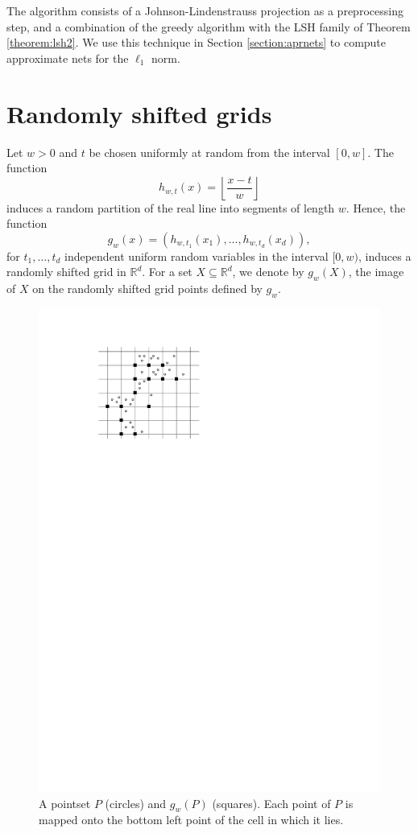 \documentclass[10pt,a4paper,twoside]{book}
\newcommand{\rd}{\mathbb{R}^{d}}
\theoremstyle{definition}
\theoremstyle{remark}
\begin{document}
The algorithm consists of a Johnson-Lindenstrauss projection as a preprocessing step, and a combination of the greedy algorithm with the LSH family of Theorem \ref{theorem:lsh2}. We use this technique in Section \ref{section:aprnets} to compute approximate nets for the $\ell_1$ norm.

\section{Randomly shifted grids} \label{grids}

Let $w >0$ and $t$ be chosen uniformly at random from the interval $[0,w]$. The function 
\[h_{w, t}(x)=\left\lfloor \frac{x-t}{w} \right\rfloor\]
induces a random partition of the real line into segments of length $w$. Hence, the function 
\[g_{w}(x)=(h_{w,t_1}(x_1),...,h_{w,t_d}(x_d)),\]
for $t_1,\ldots,t_d$ independent uniform random variables in the interval $[0,w)$, 
induces a randomly shifted grid in $\rd$. For a set $X \subseteq \rd$, we denote by $g_{w}(X)$, the image of $X$ on the randomly shifted grid points defined by $g_{w}$. 

\begin{figure}[ht]
    \centering
    \includegraphics[scale=0.7]{figures/grid2.pdf}
    \caption{A pointset $P$ (circles) and $g_w(P)$ (squares). Each point of $P$ is mapped onto the bottom left point of the cell in which it lies.}
    \label{fig:grid78}
\end{figure}
\end{document}
